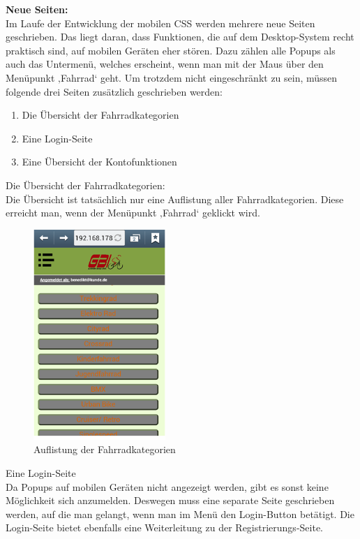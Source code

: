 \textbf{Neue Seiten:}
\\
Im Laufe der Entwicklung der mobilen CSS werden mehrere neue Seiten geschrieben. Das liegt daran, dass Funktionen, die auf dem Desktop-System recht praktisch sind, auf mobilen Geräten eher stören. Dazu zählen alle Popups als auch das Untermenü, welches erscheint, wenn man mit der Maus über den Menüpunkt ‚Fahrrad‘ geht. Um trotzdem nicht eingeschränkt zu sein, müssen folgende drei Seiten zusätzlich geschrieben werden:
\begin{enumerate}
\item Die Übersicht der Fahrradkategorien 
\item Eine Login-Seite
\item Eine Übersicht der Kontofunktionen
\end{enumerate}
Die Übersicht der Fahrradkategorien:
\\
Die Übersicht ist tatsächlich nur eine Auflistung aller Fahrradkategorien. Diese erreicht man, wenn der Menüpunkt ‚Fahrrad‘ geklickt wird. 

\begin{figure}[H]
\begin{center}
\includegraphics[width=5cm]{Bilder/Michael_Abbildung7-AuflistungDerFahrradkategorien.png}
\end{center}
\caption{Auflistung der Fahrradkategorien}
\end{figure}

Eine Login-Seite
\\
Da Popups auf mobilen Geräten nicht angezeigt werden, gibt es sonst keine Möglichkeit sich anzumelden. Deswegen muss eine separate Seite geschrieben werden, auf die man gelangt, wenn man im Menü den Login-Button betätigt. Die Login-Seite bietet ebenfalls eine Weiterleitung zu der Registrierungs-Seite.

